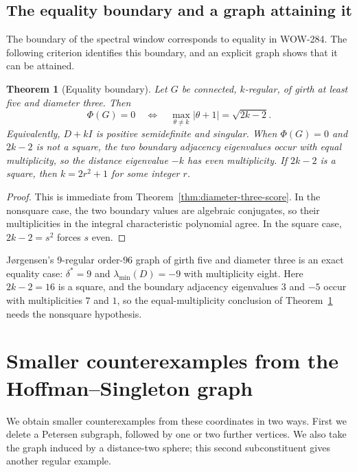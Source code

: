 \documentclass[a4paper,10pt,reqno]{amsart}
\theoremstyle{plain}
\newtheorem{theorem}{Theorem}[section]
\theoremstyle{definition}
\theoremstyle{remark}
\begin{document}
\subsection{The equality boundary and a graph attaining it}
\label{sec:controls}

The boundary of the spectral window corresponds to equality in
WOW-284. The following criterion identifies this boundary, and an explicit
graph shows that it can be attained.

\begin{theorem}[Equality boundary]\label{thm:equality-boundary}
Let \(G\) be connected, \(k\)-regular, of girth at least five and diameter
three.  Then
\[
 \Phi(G)=0
 \quad\Longleftrightarrow\quad
 \max_{\theta\ne k}|\theta+1|=\sqrt{2k-2}.
\]
Equivalently, \(D+kI\) is positive semidefinite and singular. When \(\Phi(G)=0\) and \(2k-2\) is
not a square, the two boundary adjacency eigenvalues occur with equal
multiplicity, so the distance eigenvalue \(-k\) has even multiplicity.  If
\(2k-2\) is a square, then \(k=2r^2+1\) for some integer \(r\).
\end{theorem}

\begin{proof}
This is immediate from Theorem~\ref{thm:diameter-three-score}.  In the
nonsquare case, the two boundary values are algebraic conjugates, so their
multiplicities in the integral characteristic polynomial agree.  In the square
case, \(2k-2=s^2\) forces \(s\) even.
\end{proof}

J{\o}rgensen's \(9\)-regular order-\(96\) graph of girth five and diameter
three \cite{Jorgensen2005} is an exact equality case: \(\delta^*=9\) and
\(\lambda_{\min}(D)=-9\) with multiplicity eight. Here \(2k-2=16\) is a
square, and the boundary adjacency eigenvalues \(3\) and \(-5\) occur with
multiplicities \(7\) and \(1\), so the equal-multiplicity conclusion of
Theorem~\ref{thm:equality-boundary} needs the nonsquare hypothesis.

\section{Smaller counterexamples from the Hoffman--Singleton graph}
\label{sec:examples}

We obtain smaller counterexamples from these coordinates in two ways.
First we delete a Petersen subgraph, followed by one or two further
vertices. We also take the graph induced by a distance-two sphere; this
second subconstituent gives another regular example.
\end{document}

